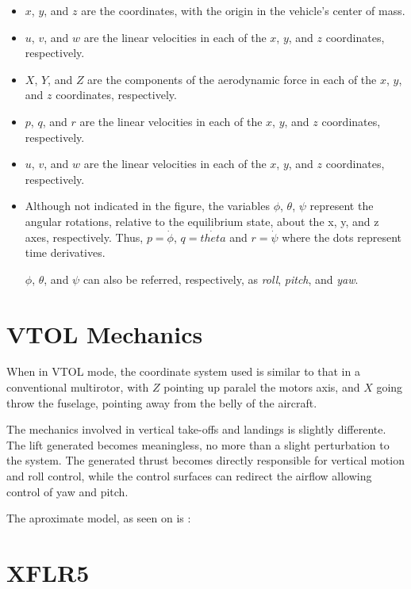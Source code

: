 \begin{itemize}

\item $x$, $y$, and $z$ are the coordinates, with the origin in the vehicle's center of mass.
\item $u$, $v$, and $w$ are the linear velocities in each of the $x$, $y$, and $z$ coordinates, respectively.
\item $X$, $Y$, and $Z$ are the components of the aerodynamic force in each of the $x$, $y$, and $z$ coordinates, respectively.
\item $p$, $q$, and $r$ are the linear velocities in each of the $x$, $y$, and $z$ coordinates, respectively.
\item $u$, $v$, and $w$ are the linear velocities in each of the $x$, $y$, and $z$ coordinates, respectively.
\item  Although not indicated in the figure, the variables $\phi$, $\theta$, $\psi$ represent the angular rotations,
relative to the equilibrium state, about the x, y, and z axes, respectively. Thus, $p=\dot{\phi}$, $q = \dot{theta}$
and $r = \dot{\psi}$ where the dots represent time derivatives.

$\phi$, $\theta$, and $\psi$ can also be referred, respectively, as \textit{roll}, \textit{pitch}, and \textit{yaw}.

\end{itemize}

\section{VTOL Mechanics}

When in VTOL mode, the coordinate system used is similar to that in a conventional multirotor, with $Z$ pointing up paralel the motors axis, and $X$ going throw the fuselage, pointing away from the belly of the aircraft.

The mechanics involved in vertical take-offs and landings is slightly differente. The lift generated becomes meaningless, no more than a slight perturbation to the system. The generated thrust becomes directly responsible for vertical motion and roll control, while the control surfaces can redirect the airflow allowing control of yaw and pitch.

The aproximate model, as seen on  is :



\section{XFLR5}

